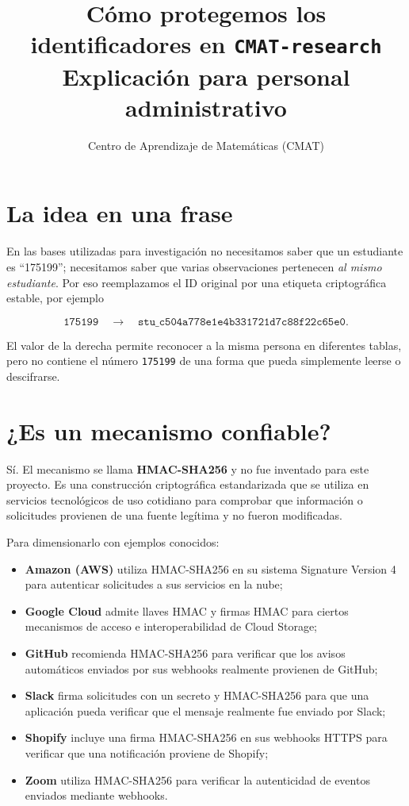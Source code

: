 \documentclass[11pt,a4paper]{article}
\title{Cómo protegemos los identificadores en \texttt{CMAT-research}\\\large Explicación para personal administrativo}
\author{Centro de Aprendizaje de Matemáticas (CMAT)}
\date{}
\begin{document}
\maketitle

\section{La idea en una frase}

En las bases utilizadas para investigación no necesitamos saber que un estudiante es ``175199''; necesitamos saber que varias observaciones pertenecen \emph{al mismo estudiante}. Por eso reemplazamos el ID original por una etiqueta criptográfica estable, por ejemplo

\[
\texttt{175199}
\quad\longrightarrow\quad
\boxed{\texttt{stu\_c504a778e1e4b331721d7c88f22c65e0}}.
\]

El valor de la derecha permite reconocer a la misma persona en diferentes tablas, pero no contiene el número \texttt{175199} de una forma que pueda simplemente leerse o descifrarse.

\section{¿Es un mecanismo confiable?}

Sí. El mecanismo se llama \textbf{HMAC-SHA256} y no fue inventado para este proyecto. Es una construcción criptográfica estandarizada que se utiliza en servicios tecnológicos de uso cotidiano para comprobar que información o solicitudes provienen de una fuente legítima y no fueron modificadas.

Para dimensionarlo con ejemplos conocidos:

\begin{itemize}[leftmargin=*]
    \item \textbf{Amazon (AWS)} utiliza HMAC-SHA256 en su sistema Signature Version 4 para autenticar solicitudes a sus servicios en la nube;
    \item \textbf{Google Cloud} admite llaves HMAC y firmas HMAC para ciertos mecanismos de acceso e interoperabilidad de Cloud Storage;
    \item \textbf{GitHub} recomienda HMAC-SHA256 para verificar que los avisos automáticos enviados por sus webhooks realmente provienen de GitHub;
    \item \textbf{Slack} firma solicitudes con un secreto y HMAC-SHA256 para que una aplicación pueda verificar que el mensaje realmente fue enviado por Slack;
    \item \textbf{Shopify} incluye una firma HMAC-SHA256 en sus webhooks HTTPS para verificar que una notificación proviene de Shopify;
    \item \textbf{Zoom} utiliza HMAC-SHA256 para verificar la autenticidad de eventos enviados mediante webhooks.
\end{itemize}
\end{document}
